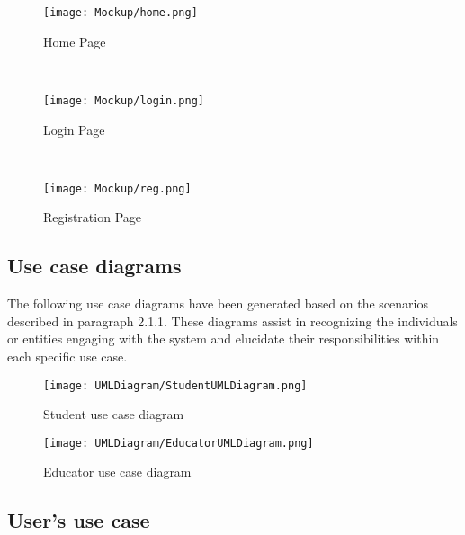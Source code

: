  \begin{figure}[H]
  \texttt{[image: Mockup/home.png]} 
  \caption{Home Page}
  \label{fig:immagine}
\end{figure}
\\
 \begin{figure}[H]
  \texttt{[image: Mockup/login.png]} 
  \caption{Login Page}
  \label{fig:immagine}
\end{figure}
\\
 \begin{figure}[H]
  \texttt{[image: Mockup/reg.png]} 
  \caption{Registration Page}
  \label{fig:immagine}
\end{figure}


\subsection{Use case diagrams}
The following use case diagrams have been generated based on the scenarios described in paragraph 2.1.1. These diagrams assist in recognizing the individuals or entities engaging with the system and elucidate their responsibilities within each specific use case.
 \begin{figure}[H]
  \texttt{[image: UMLDiagram/StudentUMLDiagram.png]} 
  \caption{Student use case diagram}
  \label{fig:immagine}
\end{figure}

 \begin{figure}[H]
  \texttt{[image: UMLDiagram/EducatorUMLDiagram.png]} 
  \caption{Educator use case diagram}
  \label{fig:immagine}
\end{figure}

\subsection{User's use case}
